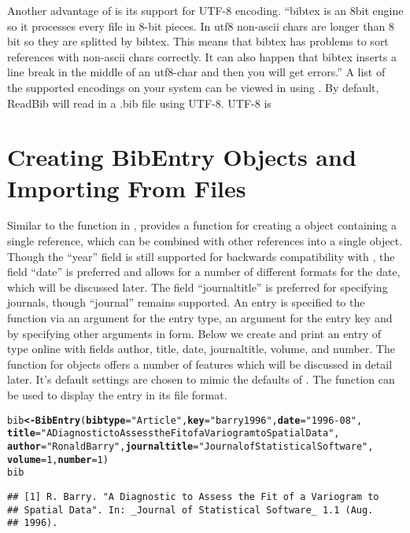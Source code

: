 \documentclass[article]{jss}\usepackage[]{graphicx}\usepackage[]{color}
\makeatletter
\newcommand{\hlnum}[1]{\textcolor[rgb]{0.125,0.125,1}{#1}}%
\newcommand{\hlstr}[1]{\textcolor[rgb]{0.125,0.125,1}{#1}}%
\newcommand{\hlstd}[1]{\textcolor[rgb]{0.251,0.251,0.282}{#1}}%
\newcommand{\hlkwb}[1]{\textcolor[rgb]{0.439,0.251,1}{\textbf{#1}}}%
\newcommand{\hlkwc}[1]{\textcolor[rgb]{0.529,0,0.184}{\textbf{#1}}}%
\newcommand{\hlkwd}[1]{\textcolor[rgb]{0.251,0.251,0.282}{\textbf{#1}}}%
\newenvironment{kframe}{%
 \def\at@end@of@kframe{}%
 \ifinner\ifhmode%
  \def\at@end@of@kframe{\end{minipage}}%
  \begin{minipage}{\columnwidth}%
 \fi\fi%
 \def\FrameCommand##1{\hskip\@totalleftmargin \hskip-\fboxsep
 \colorbox{shadecolor}{##1}\hskip-\fboxsep
     \hskip-\linewidth \hskip-\@totalleftmargin \hskip\columnwidth}%
 \MakeFramed {\advance\hsize-\width
   \@totalleftmargin\z@ \linewidth\hsize
   \@setminipage}}%
 {\par\unskip\endMakeFramed%
 \at@end@of@kframe}
\newenvironment{knitrout}{}{} %
\newcommand{\ourpkg}{\pkg{RefManageR}}
\makeatother
\begin{document}
Another advantage of \Biblatex{} is its support for UTF-8 encoding. ``bibtex is an 8bit engine so it processes every file in 8-bit pieces. In utf8 non-ascii chars are longer than 8 bit so they are splitted by bibtex. This means that bibtex has problems to sort references with non-ascii chars correctly. It can also happen that bibtex inserts a line break in the middle of an utf8-char and then you will get errors.''  A list of the supported encodings on your system can be viewed in  using .  By default, ReadBib will read in a .bib file using UTF-8.  UTF-8 is  
\section{Creating BibEntry Objects and Importing From Files}
Similar to the  function in , \ourpkg{} provides a function  for creating a  object containing a single reference, which can be combined with other references into a single  object.  Though the ``year'' field is still supported for backwards compatibility with \Bibtex{}, the field ``date'' is preferred and allows for a number of different formats for the date, which will be discussed later.  The field ``journaltitle'' is preferred for specifying journals, though ``journal'' remains supported.  An entry is specified to the  function via an argument  for the entry type, an argument  for the entry key and by specifying other arguments
in  form.  Below we create and print an entry of type online with fields author, title, date, journaltitle, volume, and number.  The  function for  objects offers a number of features which will be discussed in detail later.  It's default settings are chosen to mimic the defaults of \Biblatex{}.  The  function can be used to display the entry in its  file format.
\begin{knitrout}
\color{fgcolor}\begin{kframe}
\begin{alltt}
\hlstd{bib} \hlkwb{<-} \hlkwd{BibEntry}\hlstd{(}\hlkwc{bibtype}\hlstd{=}\hlstr{"Article"}\hlstd{,} \hlkwc{key} \hlstd{=} \hlstr{"barry1996"}\hlstd{,} \hlkwc{date} \hlstd{=} \hlstr{"1996-08"}\hlstd{,}
  \hlkwc{title} \hlstd{=} \hlstr{"A Diagnostic to Assess the Fit of a Variogram to Spatial Data"}\hlstd{,}
  \hlkwc{author} \hlstd{=} \hlstr{"Ronald Barry"}\hlstd{,} \hlkwc{journaltitle} \hlstd{=} \hlstr{"Journal of Statistical Software"}\hlstd{,}
                 \hlkwc{volume} \hlstd{=} \hlnum{1}\hlstd{,} \hlkwc{number} \hlstd{=} \hlnum{1}\hlstd{)}
\hlstd{bib}
\end{alltt}
\begin{verbatim}
## [1] R. Barry. "A Diagnostic to Assess the Fit of a Variogram to
## Spatial Data". In: _Journal of Statistical Software_ 1.1 (Aug.
## 1996).
\end{verbatim}
\end{kframe}
\end{knitrout}
\end{document}
